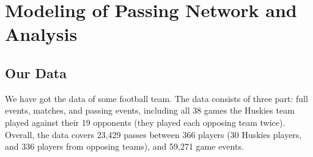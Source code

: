 \documentclass[12pt]{mcmthesis}
\begin{document}
\section{Modeling of Passing Network and Analysis}

\subsection{Our Data}
We have got the data of some football team. The data consists of three part: full events, matches, and passing events, including all 38 games the Huskies team played against their 19 opponents (they played each opposing team twice). Overall, the data covers 23,429 passes between 366 players (30 Huskies players, and 336 players from opposing teams), and 59,271 game events.

\newcommand{\tabincell}[2]{\begin{tabular}{@{}#1@{}}#2\end{tabular}}
\end{document}
